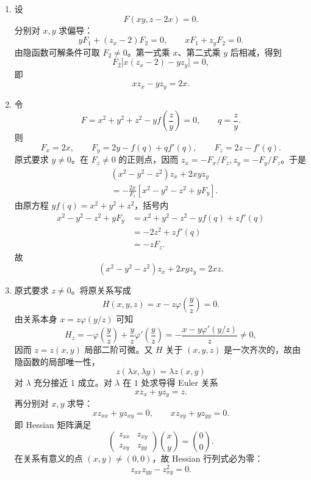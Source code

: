 \begin{xsolution}
\begin{enumerate}[label=(\arabic*)]
  \item 设
  \[
    F(xy,z-2x)=0.
  \]
  分别对 $x,y$ 求偏导：
  \[
    yF_1+(z_x-2)F_2=0,
    \qquad
    xF_1+z_yF_2=0.
  \]
  由隐函数可解条件可取 $F_2\ne0$。第一式乘 $x$、第二式乘 $y$ 后相减，得到
  \[
    F_2\bigl[x(z_x-2)-yz_y\bigr]=0,
  \]
  即
  \[
    \boxed{xz_x-yz_y=2x}.
  \]

  \item 令
  \[
    F=x^2+y^2+z^2-yf\!\left(\frac zy\right)=0,
    \qquad q=\frac zy.
  \]
  则
  \[
    F_x=2x,
    \qquad
    F_y=2y-f(q)+qf'(q),
    \qquad
    F_z=2z-f'(q).
  \]
  原式要求 $y\ne0$。在 $F_z\ne0$ 的正则点，因而 $z_x=-F_x/F_z,z_y=-F_y/F_z$。于是
  \begin{align*}
    &(x^2-y^2-z^2)z_x+2xyz_y\\
    &=-\frac{2x}{F_z}
      \left[x^2-y^2-z^2+yF_y\right].
  \end{align*}
  由原方程 $yf(q)=x^2+y^2+z^2$，括号内
  \begin{align*}
    x^2-y^2-z^2+yF_y
    &=x^2+y^2-z^2-yf(q)+zf'(q)\\
    &=-2z^2+zf'(q)\\
    &=-zF_z.
  \end{align*}
  故
  \[
    \boxed{(x^2-y^2-z^2)z_x+2xyz_y=2xz}.
  \]

  \item 原式要求 $z\ne0$。将原关系写成
  \[
    H(x,y,z)=x-z\varphi\!\left(\frac yz\right)=0.
  \]
  由关系本身 $x=z\varphi(y/z)$ 可知
  \[
    H_z=-\varphi\!\left(\frac yz\right)
         +\frac yz\varphi'\!\left(\frac yz\right)
       =-\frac{x-y\varphi'(y/z)}{z}\ne0,
  \]
  因而 $z=z(x,y)$ 局部二阶可微。又 $H$ 关于 $(x,y,z)$ 是一次齐次的，故由隐函数的局部唯一性，
  \[
    z(\lambda x,\lambda y)=\lambda z(x,y)
  \]
  对 $\lambda$ 充分接近 $1$ 成立。对 $\lambda$ 在 $1$ 处求导得 Euler 关系
  \[
    xz_x+yz_y=z.
  \]
  再分别对 $x,y$ 求导：
  \[
    xz_{xx}+yz_{xy}=0,
    \qquad
    xz_{xy}+yz_{yy}=0.
  \]
  即 Hessian 矩阵满足
  \[
    \begin{pmatrix}
      z_{xx}&z_{xy}\\
      z_{xy}&z_{yy}
    \end{pmatrix}
    \binom xy=\binom00.
  \]
  在关系有意义的点 $(x,y)\ne(0,0)$，故 Hessian 行列式必为零：
  \[
    \boxed{z_{xx}z_{yy}-z_{xy}^2=0}.
  \]


\end{enumerate}
\end{xsolution}
